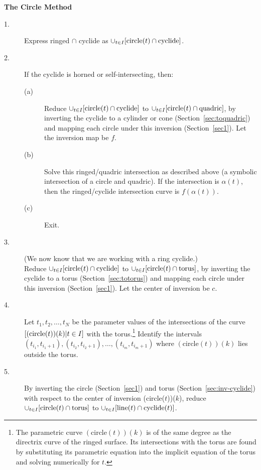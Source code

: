 \centerline{{\bf The Circle Method}}
\begin{description}
\item[1.]
	Express ringed $\cap$ cyclide as
		$\cup_{t \in I}[{\rm circle}(t) \cap {\rm cyclide}]$.
\item[2.]
	If the cyclide is horned or self-intersecting, 
	then:
\begin{description}
\item[(a)]
	Reduce $\cup_{t \in I}[{\rm circle}(t) \cap {\rm cyclide}]$
		to $\cup_{t \in I}[{\rm circle}(t) \cap {\rm quadric}]$,
		by inverting the cyclide to a cylinder or cone 
	(Section~\ref{sec:toquadric}) and mapping each circle under this
	inversion (Section~\ref{sec1}).
	Let the inversion map be $f$.
\item[(b)]
	Solve this ringed/quadric intersection as described above (a symbolic 
	intersection of a circle and quadric).
	If the intersection is $\alpha(t)$,
	then the ringed/cyclide intersection curve is 
	$f(\alpha(t))$.
\item[(c)]
	Exit.
\end{description}
\item[3.]
(We now know that we are working with a ring cyclide.)\\
	Reduce $\cup_{t \in I}[{\rm circle}(t) \cap {\rm cyclide}]$
		to $\cup_{t \in I}[{\rm circle}(t) \cap {\rm torus}]$,
		by inverting the cyclide to a torus (Section~\ref{sec:totorus})
		and mapping each circle under this inversion 
		(Section~\ref{sec1}).
		Let the center of inversion be $c$.
\item[4.]
	Let $t_1,t_2,\ldots,t_N$ be the parameter values of the intersections
	of the curve $[(\mbox{circle}(t))(k) | \\ t \in I]$ with the 
	torus.\footnote{The parametric curve $(\mbox{circle}(t))(k)$
		is of the same degree as the directrix curve of the ringed
		surface.  Its intersections with the torus are found by
		substituting its parametric equation into the implicit equation
		of the torus and solving numerically for $t$.}
	Identify the intervals $(t_{i_1},t_{i_{1}+1}), (t_{i_2},t_{i_{2}+1}),
		\ldots, (t_{i_m},t_{i_{m}+1})$
		where $(\mbox{circle}(t))(k)$ lies outside the torus.
\item[5.]
	By inverting the circle (Section~\ref{sec1}) and 
	torus (Section~\ref{sec:inv-cyclide}) with respect to the 
	center of inversion (circle($t$))($k$),
	reduce $\cup_{t \in I}[{\rm circle}(t) \cap {\rm torus}]$
		to $\cup_{t \in I}[{\rm line}(t) \cap {\rm cyclide}(t)]$.

\end{description}
